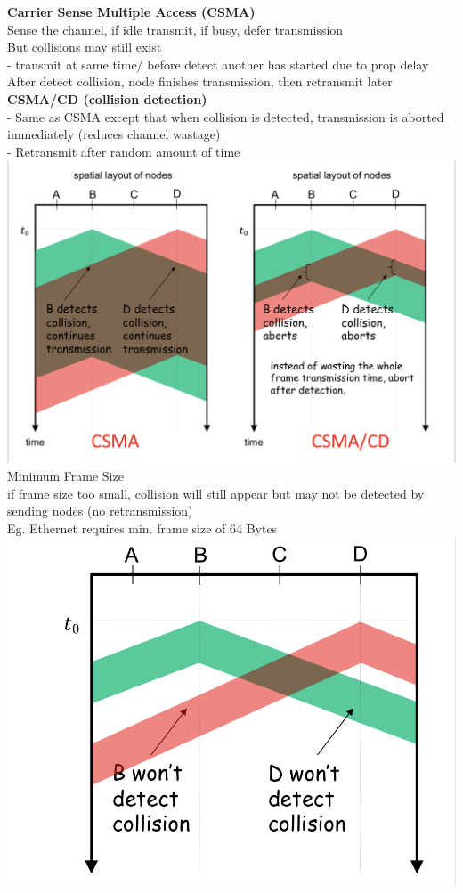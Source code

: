 \documentclass[10pt, a4paper]{article}
\newcommand{\blue}[1]{{\color{MidnightBlue}#1}}
\newcommand{\red}[1]{{\color{red}#1}}
\newcommand{\green}[1]{{\color{ForestGreen}#1}}
\begin{document}
\begin{multicols*}{3}
		\textbf{Carrier Sense Multiple Access (CSMA)}\\
		Sense the channel, if \green{idle} transmit, if \red{busy}, defer transmission\\
		But \red{collisions} may still exist\\
		- transmit at same time/ before detect another has started due to prop delay\\
		After detect collision, node finishes transmission, then retransmit later\\
		\textbf{CSMA/CD (collision detection)}\\
		- Same as CSMA except that when collision is detected, transmission is \blue{aborted immediately} (reduces channel wastage)\\
		- Retransmit after \blue{random} amount of time\\
		\includegraphics[scale=.13]{./assets/CSMA}\\

		Minimum Frame Size\\
		if frame size too small, \red{collision will still appear} but \red{may not be detected} by sending nodes (no retransmission)\\
		Eg. Ethernet requires min. frame size of 64 Bytes\\
		\includegraphics[scale=.14]{./assets/csmaMinFrame}


\end{multicols*}
\end{document}
